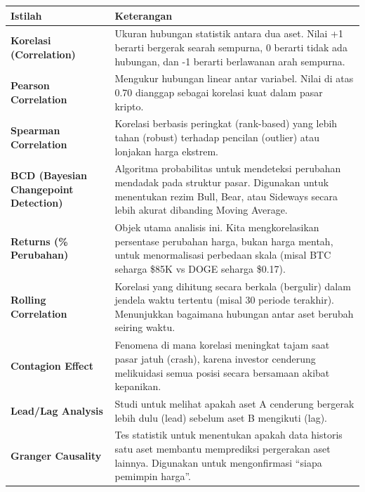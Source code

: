 \documentclass[
  11pt,
  a4paper,
]{article}
\newcounter{none} %
\begin{document}
{\def\LTcaptype{none} %
\begin{longtable}[]{@{}
  >{\raggedright\arraybackslash}p{}
  >{\raggedright\arraybackslash}p{}@{}}
\toprule\noalign{}
\begin{minipage}[b]{\linewidth}\raggedright
Istilah
\end{minipage} & \begin{minipage}[b]{\linewidth}\raggedright
Keterangan
\end{minipage} \\
\midrule\noalign{}
\endhead
\bottomrule\noalign{}
\endlastfoot
\textbf{Korelasi (Correlation)} & Ukuran hubungan statistik antara dua
aset. Nilai +1 berarti bergerak searah sempurna, 0 berarti tidak ada
hubungan, dan -1 berarti berlawanan arah sempurna. \\
\textbf{Pearson Correlation} & Mengukur hubungan linear antar variabel.
Nilai di atas 0.70 dianggap sebagai korelasi kuat dalam pasar kripto. \\
\textbf{Spearman Correlation} & Korelasi berbasis peringkat (rank-based)
yang lebih tahan (robust) terhadap pencilan (outlier) atau lonjakan
harga ekstrem. \\
\textbf{BCD (Bayesian Changepoint Detection)} & Algoritma probabilitas
untuk mendeteksi perubahan mendadak pada struktur pasar. Digunakan untuk
menentukan rezim Bull, Bear, atau Sideways secara lebih akurat dibanding
Moving Average. \\
\textbf{Returns (\% Perubahan)} & Objek utama analisis ini. Kita
mengkorelasikan persentase perubahan harga, bukan harga mentah, untuk
menormalisasi perbedaan skala (misal BTC seharga \$85K vs DOGE seharga
\$0.17). \\
\textbf{Rolling Correlation} & Korelasi yang dihitung secara berkala
(bergulir) dalam jendela waktu tertentu (misal 30 periode terakhir).
Menunjukkan bagaimana hubungan antar aset berubah seiring waktu. \\
\textbf{Contagion Effect} & Fenomena di mana korelasi meningkat tajam
saat pasar jatuh (crash), karena investor cenderung melikuidasi semua
posisi secara bersamaan akibat kepanikan. \\
\textbf{Lead/Lag Analysis} & Studi untuk melihat apakah aset A cenderung
bergerak lebih dulu (lead) sebelum aset B mengikuti (lag). \\
\textbf{Granger Causality} & Tes statistik untuk menentukan apakah data
historis satu aset membantu memprediksi pergerakan aset lainnya.
Digunakan untuk mengonfirmasi ``siapa pemimpin harga''. \\
\end{longtable}
}
\end{document}
